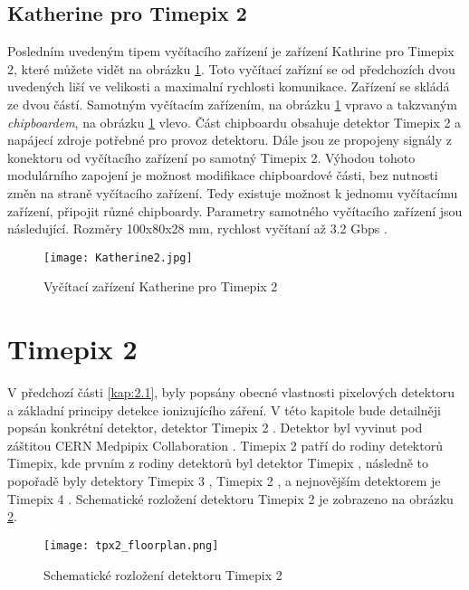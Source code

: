 \subsection{Katherine pro Timepix 2} %
\label{Katherine}
Posledním uvedeným tipem vyčítacího zařízení je zařízení Kathrine pro Timepix 2, které můžete vidět na obrázku \ref{fig:Katherine2}. Toto vyčítací zařízní se od předchozích dvou uvedených liší ve velikosti a maximalní rychlosti komunikace. Zařízení se skládá ze dvou částí. Samotným vyčítacím zařízením, na obrázku \ref{fig:Katherine2} vpravo a takzvaným \textit{chipboardem}, na obrázku \ref{fig:Katherine2} vlevo. Část chipboardu obsahuje detektor Timepix 2 a napájecí zdroje potřebné pro provoz detektoru. Dále jsou ze propojeny signály z konektoru od vyčítacího zařízení po samotný Timepix 2. Výhodou tohoto modulárního zapojení je možnost modifikace chipboardové části, bez nutnosti změn na straně vyčítacího zařízení. Tedy existuje možnost k jednomu vyčítacímu zařízení, připojit různé chipboardy. Parametry samotného vyčítacího zařízení jsou následující. Rozměry 100x80x28 mm, rychlost vyčítaní až 3.2 Gbps \cite{Burian_2020}.
\begin{figure}[h!]
	\centering
	\captionsetup{justification=centering}
	\texttt{[image: Katherine2.jpg]}
	\caption{Vyčítací zařízení Katherine pro Timepix 2 \cite{Burian_2020}} 
	\label{fig:Katherine2}
\end{figure}	


\section{Timepix 2}
\label{Timepix2}
V předchozí části \ref{kap:2.1}, byly popsány obecné vlastnosti pixelových detektoru a základní principy detekce ionizujícího záření. V této kapitole bude detailněji popsán konkrétní detektor, detektor Timepix 2 \cite{tpx2_manual}. Detektor byl vyvinut pod záštitou CERN Medpipix Collaboration \cite{Medpix}. Timepix 2 patří do rodiny detektorů Timepix, kde prvním z rodiny detektorů byl detektor Timepix \cite{Llopart}, následně to popořadě byly detektory Timepix 3 \cite{Timepix3}, Timepix 2 \cite{tpx2_manual}, \cite{Timepix2} a nejnovějším detektorem je Timepix 4 \cite{Timepix4}. Schematické rozložení detektoru Timepix 2 je zobrazeno na obrázku \ref{fig:tpx2_floorplan}. 
\begin{figure}[h!]
	\centering
	\captionsetup{justification=centering}
	\texttt{[image: tpx2\_floorplan.png]}
	\caption{Schematické rozložení detektoru Timepix 2 \cite{tpx2_manual}} 
	\label{fig:tpx2_floorplan}
\end{figure}	

